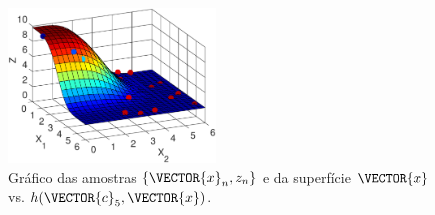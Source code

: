 \begin{SolutionT}
    \begin{figure}[!h]
        \centering
        \includegraphics[width=0.49\textwidth]{chapters/mapeamento/mfiles/mapeamentornr1-nonlinear/minimizando_hx.eps}
        \caption{Gráfico das amostras $\{\VECTOR{x}_n,z_n\}$ e da superfície $\VECTOR{x}$ vs. $h(\VECTOR{c}_5,\VECTOR{x})$.}
        \label{fig:theo:maphcxrnr1:xnyn}
    \end{figure}

\end{SolutionT}


